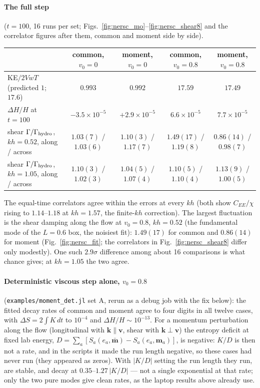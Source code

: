 \documentclass[11pt,aps,preprint,nofootinbib,superscriptaddress,tightenlines]{revtex4-2}
\def\Fig#1{Fig.~\ref{#1}}
\let\oldparagraph\paragraph
\renewcommand{\paragraph}{\par\bigskip\oldparagraph}
\begin{document}
\paragraph{The full step} ($t=100$, 16 runs per set; Figs.~\ref{fig:nersc_mo}--\ref{fig:nersc_shear8} and the correlator figures after them, common and moment side by side).
\begin{center}
\begin{tabular}{lcccc}
\hline
 & common, $v_0=0$ & moment, $v_0=0$ & common, $v_0=0.8$ & moment, $v_0=0.8$ \\ \hline
KE$/2VwT$ (predicted $1$; $17.6$) & $0.993$ & $0.992$ & $17.59$ & $17.49$ \\
$\Delta H/H$ at $t=100$ & $-3.5\times10^{-5}$ & $+2.9\times10^{-5}$ & $6.6\times10^{-5}$ & $7.7\times10^{-5}$ \\
shear $\Gamma/\Gamma_{\rm hydro}$, $kh=0.52$, along / across & $1.03(7)$ / $1.03(6)$ & $1.10(3)$ / $1.17(7)$ & $1.49(17)$ / $1.19(8)$ & $0.86(14)$ / $0.98(7)$ \\
shear $\Gamma/\Gamma_{\rm hydro}$, $kh=1.05$, along / across & $1.10(3)$ / $1.02(3)$ & $1.04(5)$ / $1.07(4)$ & $1.10(5)$ / $1.10(4)$ & $1.13(9)$ / $1.00(5)$ \\
\hline
\end{tabular}
\end{center}
The equal-time correlators agree within the errors at every $kh$ (both show $C_{EE}/\chi$ rising to $1.14$--$1.18$ at $kh=1.57$, the
finite-$kh$ correction).  The largest fluctuation is the shear damping along the flow at $v_0=0.8$, $kh=0.52$ (the fundamental mode of the $L=0.6$ box, the
noisiest fit): $1.49(17)$ for common and $0.86(14)$ for moment (\Fig{fig:nersc_fit}; the correlators in \Fig{fig:nersc_shear8} differ only
modestly).  One such $2.9\sigma$ difference among about 16 comparisons is what chance gives; at $kh=1.05$ the two agree.

\paragraph{Deterministic viscous step alone, $v_0=0.8$} (\texttt{examples/moment\_det.jl} set A, rerun as a debug job with the fix below): the
fitted decay rates of common and moment agree to four digits in all twelve cases, with $\Delta S=2\int K\,dt$ to $10^{-4}$ and $\Delta H/H\sim10^{-13}$.
For a momentum perturbation along the flow (longitudinal with $\bm k\parallel\bm v$, shear with $\bm k\perp\bm v$) the entropy deficit at fixed lab
energy, $D=\sum_a[S_a(e_a,\bar{\bm m})-S_a(e_a,\bm m_a)]$, is negative: $K/D$ is then not a rate, and in the scripts it made the run length
negative, so these cases had never run (they appeared as zeros).  With $|K/D|$ setting the run length they run, are stable, and decay at
$0.35$--$1.27\,|K/D|$ --- not a single exponential at that rate; only the two pure modes give clean rates, as the laptop results above already use.
\end{document}
